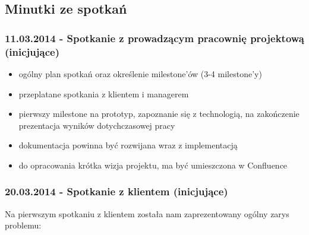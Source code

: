 \documentclass[polish, 12pt]{aghthesis}
\begin{document}
	\subsection{Minutki ze spotkań}
	
		\subsubsection*{11.03.2014 - Spotkanie z prowadzącym pracownię projektową (inicjujące)}
		
			\begin{itemize}
			
				\item ogólny plan spotkań oraz określenie milestone'ów (3-4 milestone'y)
				\item przeplatane spotkania z klientem i managerem
				\item pierwszy milestone na prototyp, zapoznanie się z technologią, na zakończenie prezentacja wyników dotychczasowej pracy
				\item dokumentacja powinna być rozwijana wraz z implementacją
				\item do opracowania krótka wizja projektu, ma być umieszczona w Confluence
						
			\end{itemize}
		
		\subsubsection*{20.03.2014 - Spotkanie z klientem (inicjujące)}
		
				Na pierwszym spotkaniu z klientem została nam zaprezentowany ogólny zarys problemu:
				
\end{document}
